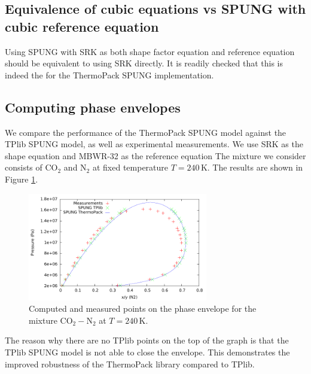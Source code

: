 \documentclass[internal,english]{sintefmemo2012}
\numberwithin{equation}{section}
\begin{document}
\subsection{Equivalence of cubic equations vs SPUNG with cubic reference
  equation}
Using SPUNG with SRK as both shape factor equation and reference
equation should be equivalent to using SRK directly. It is readily
checked that this is indeed the for the ThermoPack SPUNG implementation.

\subsection{Computing phase envelopes}
We compare the performance of the ThermoPack SPUNG model against
the TPlib SPUNG model, as well as experimental measurements. We use
SRK as the shape equation and MBWR-32 as the reference equation The
mixture we consider consists of $\mathrm{CO}_2$ and $\mathrm N_2$ at
fixed temperature $T=240 \, \mathrm{K}$. The results are shown in
Figure \ref{fig:phaseEnv}.

\begin{figure}[h]
  \centering
  \includegraphics[width=0.7\textwidth]{figures/phaseEnvelope_regular.pdf}
  \caption{Computed and measured points on the phase envelope for the mixture
    $\mathrm{CO}_2-\mathrm N_2$ at $T=240 \, \mathrm{K}$.}
  \label{fig:phaseEnv}
\end{figure}

The reason why there are no TPlib points on the top of the graph is
that the TPlib SPUNG model is not able to close the envelope. This
demonstrates the improved robustness of the ThermoPack library
compared to TPlib.
\end{document}
